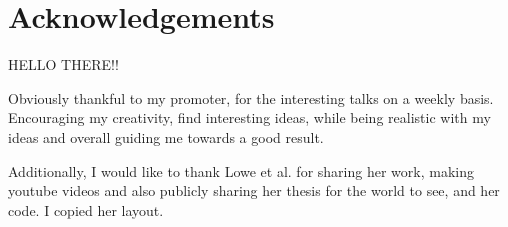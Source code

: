 \chapter*{Acknowledgements}
HELLO THERE!!

Obviously thankful to my promoter, for the interesting talks on a weekly basis.
Encouraging my creativity, find interesting ideas, while being realistic with my ideas and overall guiding me towards a good result.


Additionally, I would like to thank Lowe et al. for sharing her work, making youtube videos and also publicly sharing her thesis for the world to see, and her code. I copied her layout.